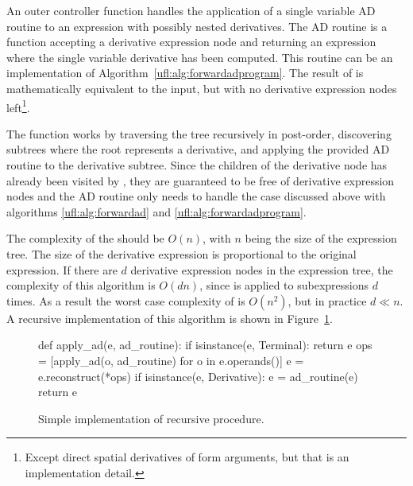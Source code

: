 An outer controller function  handles the application
of a single variable AD routine to an expression with possibly nested
derivatives.  The AD routine is a function accepting a derivative
expression node and returning an expression where the single variable
derivative has been computed.  This routine can be an implementation
of Algorithm~\ref{ufl:alg:forwardadprogram}.  The result of
 is mathematically equivalent to the input, but with
no derivative expression nodes left\footnote{Except direct spatial
  derivatives of form arguments, but that is an implementation
  detail.}.

The function  works by traversing the tree
recursively in post-order, discovering subtrees where the root
represents a derivative, and applying the provided AD routine to the
derivative subtree.  Since the children of the derivative node has
already been visited by , they are guaranteed to be
free of derivative expression nodes and the AD routine only needs to
handle the case discussed above with algorithms
\ref{ufl:alg:forwardad} and \ref{ufl:alg:forwardadprogram}.

The complexity of the  should be $O(n)$, with $n$
being the size of the expression tree.  The size of the derivative
expression is proportional to the original expression.  If there are
$d$ derivative expression nodes in the expression tree, the complexity
of this algorithm is $O(d n)$, since  is applied to
subexpressions $d$ times.  As a result the worst case complexity of
 is $O(n^2)$, but in practice $d \ll n$.  A recursive
implementation of this algorithm is shown in
Figure~\ref{ufl:fig:applyad}.


\begin{figure}[ht]
\begin{python}
def apply_ad(e, ad_routine):
    if isinstance(e, Terminal):
        return e
    ops = [apply_ad(o, ad_routine) for o in e.operands()]
    e = e.reconstruct(*ops)
    if isinstance(e, Derivative):
        e = ad_routine(e)
    return e
\end{python}
\caption{Simple implementation of recursive  procedure.}
\label{ufl:fig:applyad}
\end{figure}

